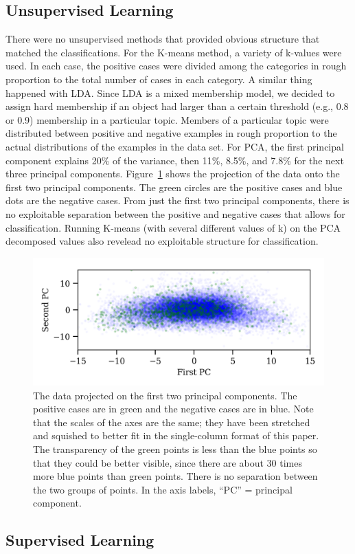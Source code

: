 \subsection{Unsupervised Learning}
There were no unsupervised methods that provided obvious structure  that matched the classifications.  For the K-means method, a variety of k-values were used.  In each case, the positive cases were divided among the categories in rough proportion to the total number of cases in each category.  A similar thing happened with LDA.  Since LDA is a mixed membership model, we decided to assign hard membership if an object had larger than a certain threshold (e.g., 0.8 or 0.9) membership in a particular topic.  Members of a particular topic were distributed between positive and negative examples in rough proportion to the actual distributions of the examples in the data set.
For PCA, the first principal component explains 20\% of the variance, then 11\%, 8.5\%, and 7.8\% for the next three principal components.  Figure~\ref{pca} shows the projection of the data onto the first two principal components.  The green circles are the positive cases and blue dots are the negative cases.  From just the first two principal components, there is no exploitable separation between the positive and negative cases that allows for classification.  Running K-means (with several different values of k) on the PCA decomposed values also revelead no exploitable structure for classification.
\begin{figure}
\begin{centering}
\includegraphics[width=5in]{pca.png}
\caption{\label{pca} The data projected on the first two principal components.  The positive cases are in green and the negative cases are in blue.  Note that the scales of the axes are the same; they have been stretched and squished to better fit in the single-column format of this paper.  The transparency of the green points is less than the blue points so that they could be better visible, since there are about 30 times more blue points than green points.  There is no separation between the two groups of points.  In the axis labels, ``PC'' = principal component.}
\end{centering}
\end{figure}







\subsection{Supervised Learning}